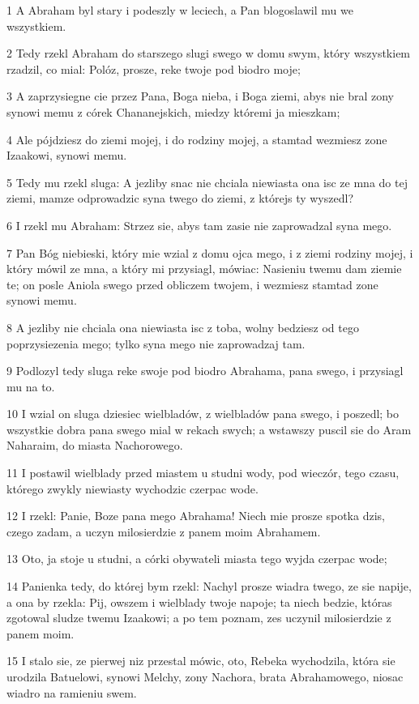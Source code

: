 \par 1 A Abraham byl stary i podeszly w leciech, a Pan blogoslawil mu we wszystkiem.
\par 2 Tedy rzekl Abraham do starszego slugi swego w domu swym, który wszystkiem rzadzil, co mial: Polóz, prosze, reke twoje pod biodro moje;
\par 3 A zaprzysiegne cie przez Pana, Boga nieba, i Boga ziemi, abys nie bral zony synowi memu z córek Chananejskich, miedzy któremi ja mieszkam;
\par 4 Ale pójdziesz do ziemi mojej, i do rodziny mojej, a stamtad wezmiesz zone Izaakowi, synowi memu.
\par 5 Tedy mu rzekl sluga: A jezliby snac nie chciala niewiasta ona isc ze mna do tej ziemi, mamze odprowadzic syna twego do ziemi, z którejs ty wyszedl?
\par 6 I rzekl mu Abraham: Strzez sie, abys tam zasie nie zaprowadzal syna mego.
\par 7 Pan Bóg niebieski, który mie wzial z domu ojca mego, i z ziemi rodziny mojej, i który mówil ze mna, a który mi przysiagl, mówiac: Nasieniu twemu dam ziemie te; on posle Aniola swego przed obliczem twojem, i wezmiesz stamtad zone synowi memu.
\par 8 A jezliby nie chciala ona niewiasta isc z toba, wolny bedziesz od tego poprzysiezenia mego; tylko syna mego nie zaprowadzaj tam.
\par 9 Podlozyl tedy sluga reke swoje pod biodro Abrahama, pana swego, i przysiagl mu na to.
\par 10 I wzial on sluga dziesiec wielbladów, z wielbladów pana swego, i poszedl; bo wszystkie dobra pana swego mial w rekach swych; a wstawszy puscil sie do Aram Naharaim, do miasta Nachorowego.
\par 11 I postawil wielblady przed miastem u studni wody, pod wieczór, tego czasu, którego zwykly niewiasty wychodzic czerpac wode.
\par 12 I rzekl: Panie, Boze pana mego Abrahama! Niech mie prosze spotka dzis, czego zadam, a uczyn milosierdzie z panem moim Abrahamem.
\par 13 Oto, ja stoje u studni, a córki obywateli miasta tego wyjda czerpac wode;
\par 14 Panienka tedy, do której bym rzekl: Nachyl prosze wiadra twego, ze sie napije, a ona by rzekla: Pij, owszem i wielblady twoje napoje; ta niech bedzie, któras zgotowal sludze twemu Izaakowi; a po tem poznam, zes uczynil milosierdzie z panem moim.
\par 15 I stalo sie, ze pierwej niz przestal mówic, oto, Rebeka wychodzila, która sie urodzila Batuelowi, synowi Melchy, zony Nachora, brata Abrahamowego, niosac wiadro na ramieniu swem.
